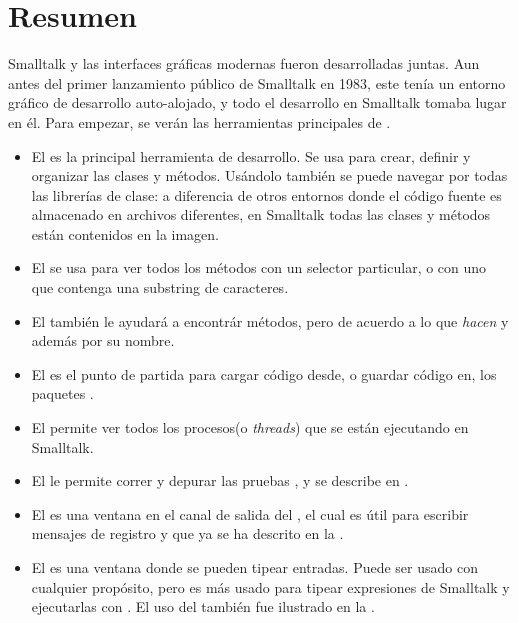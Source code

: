 \documentclass[spanish,a4paper,10pt,twoside]{book}
\begin{document}
\section{Resumen}

Smalltalk y las interfaces gr\'aficas modernas fueron desarrolladas juntas.
Aun antes del primer lanzamiento p\'ublico de Smalltalk en 1983, este ten\'ia un entorno gr\'afico de desarrollo auto-alojado, y todo el desarrollo en Smalltalk tomaba lugar en \'el.
Para empezar, se ver\'an las herramientas principales de \pharo.

\begin{itemize}
	\item {El } es la principal herramienta de desarrollo. Se usa para crear, definir y organizar las clases y m\'etodos. Us\'andolo tambi\'en se puede navegar por todas las librer\'ias de clase: a diferencia de otros entornos donde el c\'odigo fuente es almacenado en archivos diferentes, en Smalltalk todas las clases y m\'etodos est\'an contenidos en la imagen.

	\item{El } se usa para ver todos los m\'etodos con un selector particular, o con uno que contenga una substring de caracteres.
	
	\item{El } tambi\'en le ayudar\'a a encontr\'ar m\'etodos, pero de acuerdo a lo que \emph{hacen} y adem\'as por su nombre.
	
	\item{El } es el punto de partida para cargar c\'odigo desde, o guardar c\'odigo en, los paquetes .

	\item{El  permite ver todos los procesos(o \emph{threads}) que se est\'an ejecutando en Smalltalk.}
	
	\item{El } le permite correr y depurar las pruebas \SUnit, y se describe en .
	
	\item{El } es una ventana en el canal de salida del , el cual es \'util para escribir mensajes de registro y que ya se ha descrito en la .
	
	\item{El } es una ventana donde se pueden tipear entradas.
	Puede ser usado con cualquier prop\'osito, pero es m\'as usado para tipear expresiones de Smalltalk y
	ejecutarlas con . El uso del  tambi\'en fue ilustrado en la .

\end{itemize}
\end{document}
